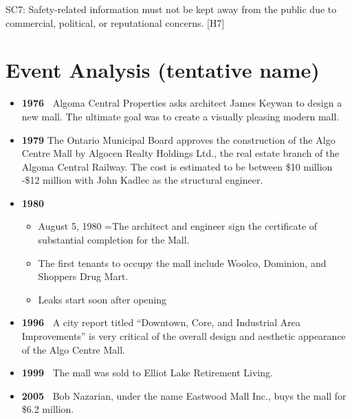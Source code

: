 \documentclass[12pt]{article}
\begin{document}
SC7: Safety-related information must not be kept away from the public due to commercial, political, or reputational concerns. [H7]




\section{Event Analysis (tentative name)} %


\begin{itemize}
    \item \textbf{\textbf{1976 }}
Algoma Central Properties asks architect James Keywan to design a new mall. The ultimate goal was to create a visually pleasing modern mall. 

    \item \textbf{\textbf{1979}}
The Ontario Municipal Board approves the construction of the Algo Centre Mall by Algocen Realty Holdings Ltd., the real estate branch of the Algoma Central Railway. The cost is estimated to be between \$10 million -\$12 million with John Kadlec as the structural engineer.

    \item \textbf{\textbf{1980}}
    \begin{itemize}
        \item August 5, 1980 =The architect and engineer sign the certificate of substantial completion for the Mall.
        \item The first tenants to occupy the mall include Woolco, Dominion, and Shoppers Drug Mart.
        \item Leaks start soon after opening 
    \end{itemize}
    \item \textbf{\textbf{1996 }}
A city report titled “Downtown, Core, and Industrial Area Improvements” is very critical of the overall design and aesthetic appearance of the Algo Centre Mall.

    \item \textbf{\textbf{1999 }}
The mall was sold to Elliot Lake Retirement Living.

    \item \textbf{\textbf{2005 }}
Bob Nazarian, under the name Eastwood Mall Inc., buys the mall for \$6.2 million.


\end{itemize}
\end{document}
